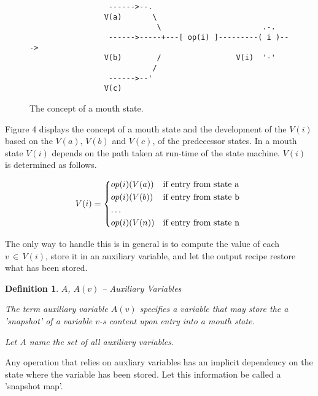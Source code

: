 \documentclass[12pt,a4paper]{scrartcl}
\newtheorem{definition}{Definition}
\begin{document}
\begin{figure}[htbp] \leavevmode
\begin{verbatim}
                  ------>--.  
                 V(a)       \ 
                             \                       .-.
                  ------>-----+---[ op(i) ]---------( i )---> 
                 V(b)        /                 V(i)  '-'
                            /
                  ------>--'
                 V(c)

\end{verbatim}
\caption{The concept of a mouth state.}
\end{figure}

Figure 4 displays the concept of a mouth state and the development of the
$V(i)$ based on the $V(a),\,V(b)$ and $V(c)$, of the predecessor states. In
a mouth state $V(i)$ depends on the path taken at run-time of the state machine.
$V(i)$ is determined as follows.

\begin{equation} \label{eq:interference}
    V(i) = \begin{dcases*}
            op(i)(V(a)) & if entry from state a \\
            op(i)(V(b)) & if entry from state b \\
            \ldots \\
            op(i)(V(n)) & if entry from state n \\
            \end{dcases*}
\end{equation}

The only way to handle this is in general is to compute the value of each $v\,\in\,V(i)$,
store it in an auxiliary variable, and let the output recipe restore what
has been stored.

\begin{definition}
$A$, $A(v)$ -- Auxiliary Variables

The term auxiliary variable $A(v)$ specifies a variable that may store the
a 'snapshot' of a variable $v$-s content upon entry into a mouth state. 
   
Let $A$ name the set of all auxiliary variables.
\end{definition}

Any operation that relies on auxliary variables has an implicit dependency
on the state where the variable has been stored. Let this information be
called a 'snapshot map'.
\end{document}
